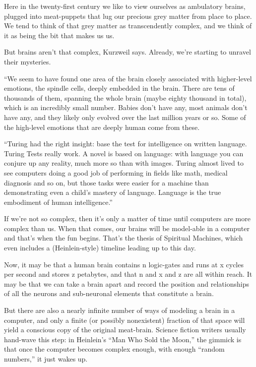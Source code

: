 Here in the twenty-first century we like to view ourselves as
ambulatory brains, plugged into meat-puppets that lug our precious
grey matter from place to place. We tend to think of that grey
matter as transcendently complex, and we think of it as being the
bit that makes us us.

But brains aren't that complex, Kurzweil says. Already, we're
starting to unravel their mysteries.

``We seem to have found one area of the brain closely associated
with higher-level emotions, the spindle cells, deeply embedded in
the brain. There are tens of thousands of them, spanning the whole
brain (maybe eighty thousand in total), which is an incredibly
small number. Babies don't have any, most animals don't have any,
and they likely only evolved over the last million years or so.
Some of the high-level emotions that are deeply human come from
these.

``Turing had the right insight: base the test for intelligence on
written language. Turing Tests really work. A novel is based on
language: with language you can conjure up any reality, much more
so than with images. Turing almost lived to see computers doing a
good job of performing in fields like math, medical diagnosis and
so on, but those tasks were easier for a machine than demonstrating
even a child's mastery of language. Language is the true embodiment
of human intelligence.''

If we're not so complex, then it's only a matter of time until
computers are more complex than us. When that comes, our brains
will be model-able in a computer and that's when the fun begins.
That's the thesis of Spiritual Machines, which even includes a
(Heinlein-style) timeline leading up to this day.

Now, it may be that a human brain contains n logic-gates and runs
at x cycles per second and stores z petabytes, and that n and x and
z are all within reach. It may be that we can take a brain apart
and record the position and relationships of all the neurons and
sub-neuronal elements that constitute a brain.

But there are also a nearly infinite number of ways of modeling a
brain in a computer, and only a finite (or possibly nonexistent)
fraction of that space will yield a conscious copy of the original
meat-brain. Science fiction writers usually hand-wave this step: in
Heinlein's ``Man Who Sold the Moon,'' the gimmick is that once the
computer becomes complex enough, with enough ``random numbers,'' it
just wakes up.

